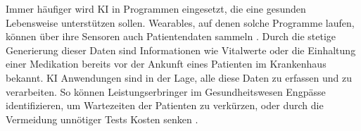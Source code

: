 Immer häufiger wird KI in Programmen eingesetzt, die eine gesunden Lebensweise unterstützen sollen. Wearables, auf denen solche Programme laufen, können über ihre Sensoren auch Patientendaten sammeln \cite{Opportunities_challenges_ai_hc}.  Durch die stetige Generierung dieser Daten sind Informationen wie Vitalwerte oder die Einhaltung einer Medikation bereits vor der Ankunft eines Patienten im Krankenhaus bekannt. KI Anwendungen sind in der Lage, alle diese Daten zu erfassen und zu verarbeiten. So können Leistungserbringer im Gesundheitswesen Engpässe identifizieren, um Wartezeiten der Patienten zu verkürzen, oder durch die Vermeidung unnötiger Tests Kosten senken \cite{Chapter_14}.\\


 